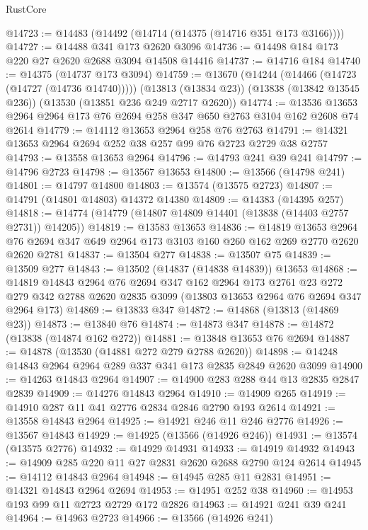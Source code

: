 \begin{lexlean}{RustCore}
\begin{coremodule}
@14723 := @14483 (@14492 (@14714 (@14375 (@14716 @351 @173 @3166))))
@14727 := @14488 @341 @173 @2620 @3096
@14736 := @14498 @184 @173 @220 @27 @2620 @2688 @3094 @14508 @14416
@14737 := @14716 @184
@14740 := @14375 (@14737 @173 @3094)
@14759 := @13670
    (@14244 (@14466 (@14723 (@14727 (@14736 @14740)))))
    (@13813 (@13834 @23))
    (@13838 (@13842 @13545 @236))
    (@13530 (@13851 @236 @249 @2717 @2620))
@14774 := @13536 @13653 @2964 @2964 @173 @76 @2694 @258 @347 @650 @2763 @3104 @162 @2608 @74 @2614
@14779 := @14112 @13653 @2964 @258 @76 @2763
@14791 := @14321 @13653 @2964 @2694 @252 @38 @257 @99 @76 @2723 @2729 @38 @2757
@14793 := @13558 @13653 @2964
@14796 := @14793 @241 @39 @241
@14797 := @14796 @2723
@14798 := @13567 @13653
@14800 := @13566 (@14798 @241)
@14801 := @14797 @14800
@14803 := @13574 (@13575 @2723)
@14807 := @14791 (@14801 @14803) @14372 @14380
@14809 := @14383 (@14395 @257)
@14818 := @14774 (@14779 (@14807 @14809 @14401 (@13838 (@14403 @2757 @2731)) @14205))
@14819 := @13583 @13653
@14836 := @14819
    @13653
    @2964
    @76
    @2694
    @347
    @649
    @2964
    @173
    @3103
    @160
    @260
    @162
    @269
    @2770
    @2620
    @2620
    @2781
@14837 := @13504 @277
@14838 := @13507 @75
@14839 := @13509 @277
@14843 := @13502 (@14837 (@14838 @14839)) @13653
@14868 := @14819
    @14843
    @2964
    @76
    @2694
    @347
    @162
    @2964
    @173
    @2761
    @23
    @272
    @279
    @342
    @2788
    @2620
    @2835
    @3099
    (@13803 @13653 @2964 @76 @2694 @347 @2964 @173)
@14869 := @13833 @347
@14872 := @14868 (@13813 (@14869 @23))
@14873 := @13840 @76
@14874 := @14873 @347
@14878 := @14872 (@13838 (@14874 @162 @272))
@14881 := @13848 @13653 @76 @2694
@14887 := @14878 (@13530 (@14881 @272 @279 @2788 @2620))
@14898 := @14248 @14843 @2964 @2964 @289 @337 @341 @173 @2835 @2849 @2620 @3099
@14900 := @14263 @14843 @2964
@14907 := @14900 @283 @288 @44 @13 @2835 @2847 @2839
@14909 := @14276 @14843 @2964
@14910 := @14909 @265
@14919 := @14910 @287 @11 @41 @2776 @2834 @2846 @2790 @193 @2614
@14921 := @13558 @14843 @2964
@14925 := @14921 @246 @11 @246 @2776
@14926 := @13567 @14843
@14929 := @14925 (@13566 (@14926 @246))
@14931 := @13574 (@13575 @2776)
@14932 := @14929 @14931
@14933 := @14919 @14932
@14943 := @14909 @285 @220 @11 @27 @2831 @2620 @2688 @2790 @124 @2614
@14945 := @14112 @14843 @2964
@14948 := @14945 @285 @11 @2831
@14951 := @14321 @14843 @2964 @2694
@14953 := @14951 @252 @38
@14960 := @14953 @193 @99 @11 @2723 @2729 @172 @2826
@14963 := @14921 @241 @39 @241
@14964 := @14963 @2723
@14966 := @13566 (@14926 @241)

\end{coremodule}
\end{lexlean}

